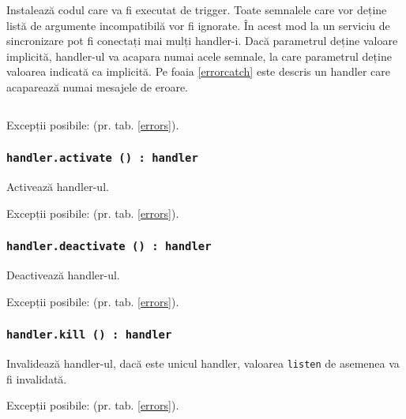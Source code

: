 Instalează codul care va fi executat de trigger. Toate semnalele care vor deține listă de argumente incompatibilă vor fi ignorate. În acest mod la un serviciu de sincronizare pot fi conectați mai mulți handler-i. Dacă parametrul deține valoare implicită, handler-ul va acapara numai acele semnale, la care parametrul deține valoarea indicată ca implicită. Pe foaia \ref{errorcatch} este descris un handler care acaparează numai mesajele de eroare.

\begin{sourcecode}
    \label{errorcatch}
    \inputminted[linenos]{icl}{../sources/errorcatch.icL}
\end{sourcecode}

Excepții posibile:  (pr. tab. \ref{errors}).

\subsubsection{\texttt{handler.activate () : handler}}

Activează handler-ul.

Excepții posibile:  (pr. tab. \ref{errors}).

\subsubsection{\texttt{handler.deactivate () : handler}}

Deactivează handler-ul.

Excepții posibile:  (pr. tab. \ref{errors}).

\subsubsection{\texttt{handler.kill () : handler}}

Invalidează handler-ul, dacă este unicul handler, valoarea \texttt{listen} de asemenea va fi invalidată.

Excepții posibile:  (pr. tab. \ref{errors}).

